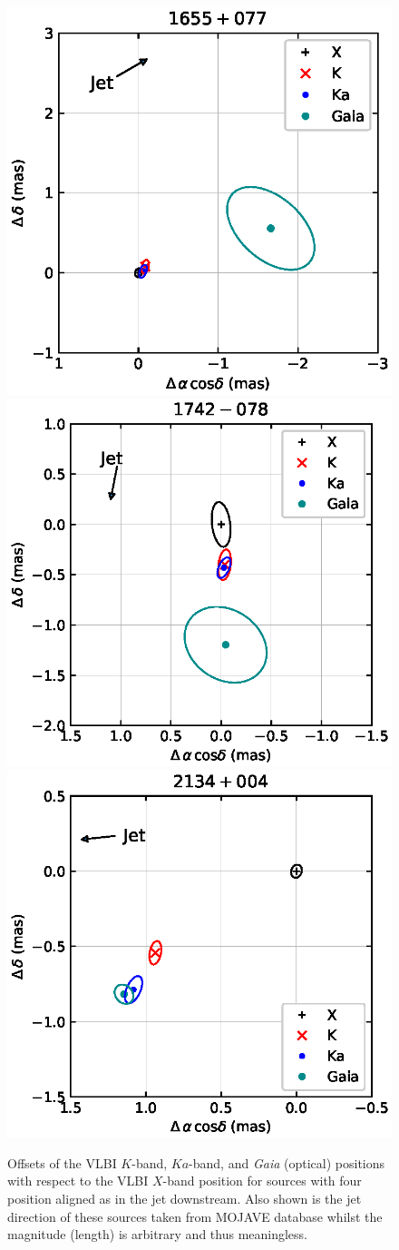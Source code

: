 \documentclass{aa}
\begin{document}
\begin{appendix}
\begin{figure}[hbtp]
        \includegraphics[width=0.45\columnwidth]{figs/1655+077}
        \includegraphics[width=0.45\columnwidth]{figs/1742-078}
        \includegraphics[width=0.45\columnwidth]{figs/2134+004}
        \caption[]{\label{fig:jet-down}
            Offsets of the VLBI $K$-band, $Ka$-band, and {\it Gaia} (optical) positions with respect to the VLBI $X$-band position for sources with four position aligned as in the jet downstream.
            Also shown is the jet direction of these sources taken from MOJAVE database whilst the magnitude (length) is arbitrary and thus meaningless.
        }
    \end{figure}


\end{appendix}
\end{document}

